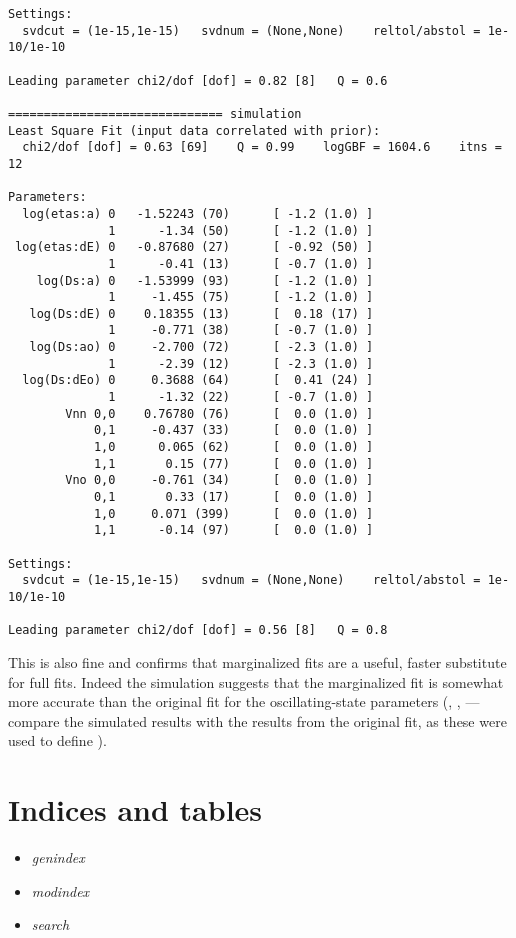 \documentclass[letterpaper,10pt,english]{sphinxmanual}
\begin{document}
\begin{itemize}
\begin{Verbatim}[commandchars=\\\{\}]
Settings:
  svdcut = (1e-15,1e-15)   svdnum = (None,None)    reltol/abstol = 1e-10/1e-10

Leading parameter chi2/dof [dof] = 0.82 [8]   Q = 0.6

============================== simulation
Least Square Fit (input data correlated with prior):
  chi2/dof [dof] = 0.63 [69]    Q = 0.99    logGBF = 1604.6    itns = 12

Parameters:
  log(etas:a) 0   -1.52243 (70)      [ -1.2 (1.0) ]  
              1      -1.34 (50)      [ -1.2 (1.0) ]  
 log(etas:dE) 0   -0.87680 (27)      [ -0.92 (50) ]  
              1      -0.41 (13)      [ -0.7 (1.0) ]  
    log(Ds:a) 0   -1.53999 (93)      [ -1.2 (1.0) ]  
              1     -1.455 (75)      [ -1.2 (1.0) ]  
   log(Ds:dE) 0    0.18355 (13)      [  0.18 (17) ]  
              1     -0.771 (38)      [ -0.7 (1.0) ]  
   log(Ds:ao) 0     -2.700 (72)      [ -2.3 (1.0) ]  
              1      -2.39 (12)      [ -2.3 (1.0) ]  
  log(Ds:dEo) 0     0.3688 (64)      [  0.41 (24) ]  
              1      -1.32 (22)      [ -0.7 (1.0) ]  
        Vnn 0,0    0.76780 (76)      [  0.0 (1.0) ]  
            0,1     -0.437 (33)      [  0.0 (1.0) ]  
            1,0      0.065 (62)      [  0.0 (1.0) ]  
            1,1       0.15 (77)      [  0.0 (1.0) ]  
        Vno 0,0     -0.761 (34)      [  0.0 (1.0) ]  
            0,1       0.33 (17)      [  0.0 (1.0) ]  
            1,0     0.071 (399)      [  0.0 (1.0) ]  
            1,1      -0.14 (97)      [  0.0 (1.0) ]  

Settings:
  svdcut = (1e-15,1e-15)   svdnum = (None,None)    reltol/abstol = 1e-10/1e-10

Leading parameter chi2/dof [dof] = 0.56 [8]   Q = 0.8
\end{Verbatim}

This is also fine and confirms that  marginalized fits
are a useful, faster substitute for full fits. Indeed the simulation
suggests that the marginalized fit is somewhat more accurate
than the original fit for the oscillating-state parameters (,
,  --- compare the simulated results with
the  results from the original fit, as these were used to
define ).

\end{itemize}


\chapter{Indices and tables}
\label{index:indices-and-tables}\begin{itemize}
\item {} 
\emph{genindex}

\item {} 
\emph{modindex}

\item {} 
\emph{search}

\end{itemize}



\renewcommand{\indexname}{Index}
\printindex
\end{document}
